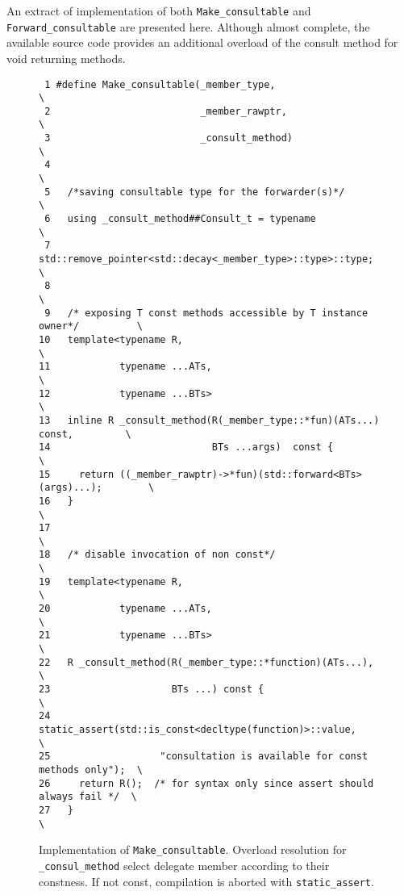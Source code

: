 \documentclass{article}
\begin{document}
An extract of implementation of both \verb+Make_consultable+ and \verb+Forward_consultable+ are presented here. Although almost complete, the available source code provides an additional overload of the consult method for void returning methods. 

\begin{figure}[ht]
{\small
\begin{lstlisting}
 1 #define Make_consultable(_member_type,                                  \
 2                          _member_rawptr,                                \
 3                          _consult_method)                               \
 4                                                                         \
 5   /*saving consultable type for the forwarder(s)*/                      \
 6   using _consult_method##Consult_t = typename                           \
 7       std::remove_pointer<std::decay<_member_type>::type>::type;        \
 8                                                                         \
 9   /* exposing T const methods accessible by T instance owner*/          \
10   template<typename R,                                                  \
11            typename ...ATs,                                             \
12            typename ...BTs>                                             \
13   inline R _consult_method(R(_member_type::*fun)(ATs...) const,         \
14                            BTs ...args)	const {                        \
15     return ((_member_rawptr)->*fun)(std::forward<BTs>(args)...);        \
16   }                                                                     \
17                                                                         \
18   /* disable invocation of non const*/                                  \
19   template<typename R,                                                  \
20            typename ...ATs,                                             \
21            typename ...BTs>                                             \
22   R _consult_method(R(_member_type::*function)(ATs...),                 \
23                     BTs ...) const {                                   \
24     static_assert(std::is_const<decltype(function)>::value,             \
25                   "consultation is available for const methods only");  \
26     return R();  /* for syntax only since assert should always fail */  \
27   }                                                                     \
\end{lstlisting}}
\cprotect\caption{Implementation of \verb+Make_consultable+. Overload resolution for \verb+_consul_method+ select delegate member according to their constness. If not const, compilation is aborted with \verb+static_assert+.}
\label{impl:make}
\end{figure}
\end{document}
